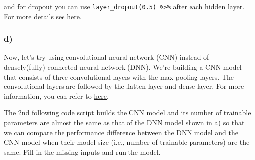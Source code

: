 \documentclass[]{article}
\newenvironment{Shaded}{\begin{snugshade}}{\end{snugshade}}
\newcommand{\CommentTok}[1]{\textcolor[rgb]{0.56,0.35,0.01}{\textit{#1}}}
\newcommand{\DecValTok}[1]{\textcolor[rgb]{0.00,0.00,0.81}{#1}}
\newcommand{\KeywordTok}[1]{\textcolor[rgb]{0.13,0.29,0.53}{\textbf{#1}}}
\newcommand{\NormalTok}[1]{#1}
\newcommand{\OperatorTok}[1]{\textcolor[rgb]{0.81,0.36,0.00}{\textbf{#1}}}
\newcommand{\StringTok}[1]{\textcolor[rgb]{0.31,0.60,0.02}{#1}}
\begin{document}
and for dropout you can use
\texttt{layer\_dropout(0.5)\ \%\textgreater{}\%} after each hidden
layer. For more details see
\href{https://keras.rstudio.com/articles/tutorial_overfit_underfit.html}{here}.

\hypertarget{d-1}{%
\subsubsection{d)}\label{d-1}}

Now, let's try using convolutional neural network (CNN) instead of
densely(fully)-connected neural network (DNN). We're building a CNN
model that consists of three convolutional layers with the max pooling
layers. The convolutional layers are followed by the flatten layer and
dense layer. For more information, you can refer to
\href{https://tensorflow.rstudio.com/tutorials/advanced/images/cnn/}{here}.

The 2nd following code script builds the CNN model and its number of
trainable parameters are almost the same as that of the DNN model shown
in a) so that we can compare the performance difference between the DNN
model and the CNN model when their model size (i.e., number of trainable
parameters) are the same. Fill in the missing inputs and run the model.

\begin{Shaded}
\end{Shaded}
\end{document}
